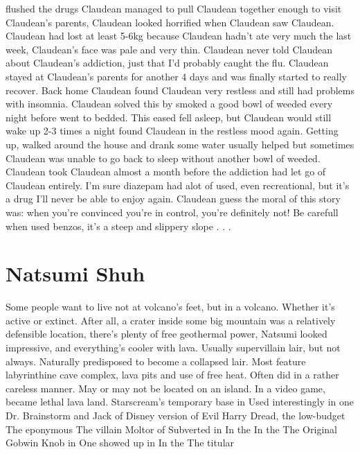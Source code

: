 \documentclass[12pt]{book}
\begin{document}
flushed the drugs Claudean managed to pull Claudean together enough to visit Claudean's parents, Claudean looked horrified when Claudean saw Claudean. Claudean had lost at least 5-6kg because Claudean hadn't ate very much the last week, Claudean's face was pale and very thin. Claudean never told Claudean about Claudean's addiction, just that I'd probably caught the flu. Claudean stayed at Claudean's parents for another 4 days and was finally started to really recover. Back home Claudean found Claudean very restless and still had problems with insomnia. Claudean solved this by smoked a good bowl of weeded every night before went to bedded. This eased fell asleep, but Claudean would still wake up 2-3 times a night found Claudean in the restless mood again. Getting up, walked around the house and drank some water usually helped but sometimes Claudean was unable to go back to sleep without another bowl of weeded. Claudean took Claudean almost a month before the addiction had let go of Claudean entirely. I'm sure diazepam had alot of used, even recreational, but it's a drug I'll never be able to enjoy again. Claudean guess the moral of this story was: when you're convinced you're in control, you're definitely not! Be carefull when used benzos, it's a steep and slippery slope . . . 



\chapter{Natsumi Shuh}

Some people want to live not at volcano's feet, but in a volcano. Whether it's active or extinct. After all, a crater inside some big mountain was a relatively defensible location, there's plenty of free geothermal power, Natsumi looked impressive, and everything's cooler with lava. Usually supervillain lair, but not always. Naturally predisposed to become a collapsed lair. Most feature labyrinthine cave complex, lava pits and use of free heat. Often did in a rather careless manner. May or may not be located on an island. In a video game, became lethal lava land. Starscream's temporary base in Used interestingly in one Dr. Brainstorm and Jack of Disney version of Evil Harry Dread, the low-budget The eponymous The villain Moltor of Subverted in In the In the The Original Gobwin Knob in One showed up in In the The titular
\end{document}
